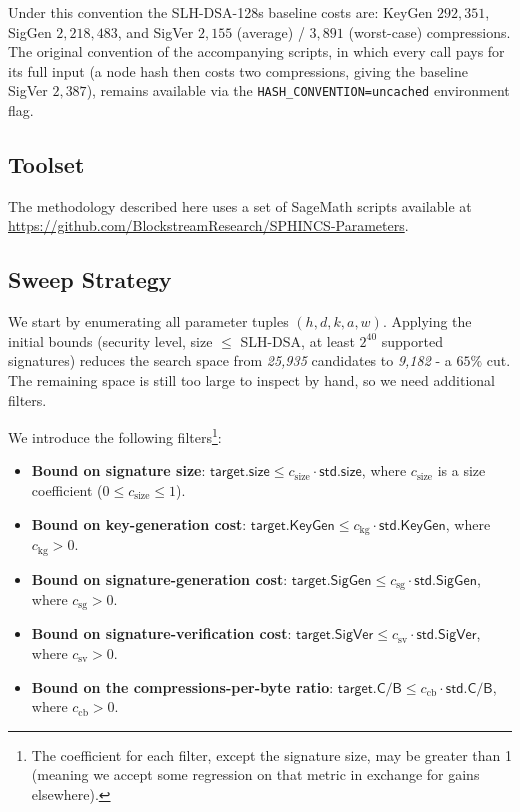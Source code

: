 Under this convention the SLH-DSA-128s baseline costs are: KeyGen $292{,}351$, SigGen $2{,}218{,}483$, and SigVer $2{,}155$ (average) / $3{,}891$ (worst-case) compressions. The original convention of the accompanying scripts, in which every call pays for its full input (a node hash then costs two compressions, giving the baseline SigVer $2{,}387$), remains available via the \texttt{HASH\_CONVENTION=uncached} environment flag.

\subsection{Toolset}
The methodology described here uses a set of SageMath scripts available at \url{https://github.com/BlockstreamResearch/SPHINCS-Parameters}.

\subsection{Sweep Strategy} \label{sec:sweep-strategy}
We start by enumerating all parameter tuples $(h, d, k, a, w)$. Applying the initial bounds (security level, size $\leq$ SLH-DSA, at least $2^{40}$ supported signatures) reduces the search space from \emph{25,935} candidates to \emph{9,182} - a $65\%$ cut. The remaining space is still too large to inspect by hand, so we need additional filters.

We introduce the following filters\footnote{The coefficient for each filter, except the signature size, may be greater than 1 (meaning we accept some regression on that metric in exchange for gains elsewhere).}:

\begin{itemize}
    \item \textbf{Bound on signature size}: $\mathsf{target.size} \leq c_{\text{size}} \cdot \mathsf{std.size}$, where $c_{\text{size}}$ is a size coefficient ($0 \leq c_{\text{size}} \leq 1$).
    \item \textbf{Bound on key-generation cost}: $\mathsf{target.KeyGen} \leq c_{\text{kg}} \cdot \mathsf{std.KeyGen}$, where $c_{\text{kg}} > 0$.
    \item \textbf{Bound on signature-generation cost}: $\mathsf{target.SigGen} \leq c_{\text{sg}} \cdot \mathsf{std.SigGen}$, where $c_{\text{sg}} > 0$.
    \item \textbf{Bound on signature-verification cost}: $\mathsf{target.SigVer} \leq c_{\text{sv}} \cdot \mathsf{std.SigVer}$, where $c_{\text{sv}} > 0$.
    \item \textbf{Bound on the compressions-per-byte ratio}: $\mathsf{target.C/B} \leq c_{\text{cb}} \cdot \mathsf{std.C/B}$, where $c_{\text{cb}} > 0$.
\end{itemize}


